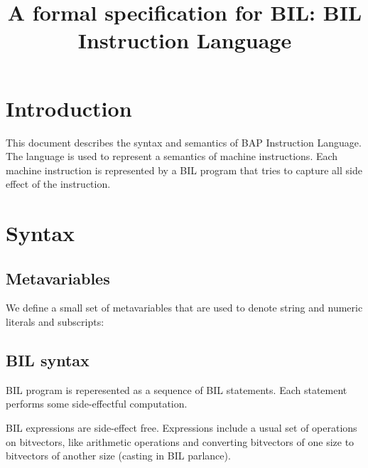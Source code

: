 \documentclass[11pt]{article}
\begin{document}


\title{A formal specification for BIL: BIL Instruction Language}
\maketitle

\tableofcontents
\clearpage

\section{Introduction}
\label{sec:intro}

This document describes the syntax and semantics of BAP Instruction
Language.  The language is used to represent a semantics of machine
instructions. Each machine instruction is represented by a BIL program
that tries to capture all side effect of the instruction.



\section{Syntax}
\label{sec:syntax}

\subsection{Metavariables}
\label{sec:meta}

We define a small set of metavariables that are used to denote string
and numeric literals and subscripts:

\ottmetavars

\subsection{BIL syntax}

BIL program is reperesented as a sequence of BIL statements. Each
statement performs some side-effectful computation.

\ottgrammartabular{
\ottbil\ottinterrule
}

\ottgrammartabular{
\ottstmt\ottinterrule
}

BIL expressions are side-effect free. Expressions include a usual set
of operations on bitvectors, like arithmetic operations and converting
bitvectors of one size to bitvectors of another size (casting in BIL
parlance).

\ottgrammartabular{
\ottexp\ottinterrule
\ottvar\ottinterrule
\ottbop\ottinterrule
\ottuop\ottinterrule
\ottendian\ottinterrule
\ottcast\ottinterrule
}
\end{document}
